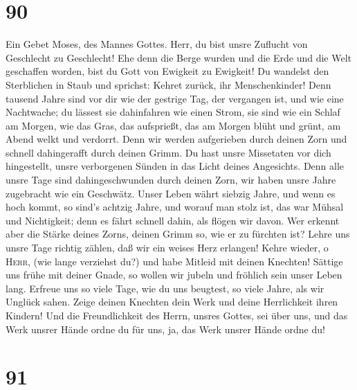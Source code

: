 \hypertarget{section-89}{%
\section{90}\label{section-89}}

 Ein Gebet Moses, des Mannes Gottes. Herr, du bist unsre
Zuflucht von Geschlecht zu Geschlecht!  Ehe denn die Berge
wurden und die Erde und die Welt geschaffen worden, bist du Gott von
Ewigkeit zu Ewigkeit!  Du wandelst den Sterblichen in
Staub und sprichst: Kehret zurück, ihr Menschenkinder! 
Denn tausend Jahre sind vor dir wie der gestrige Tag, der vergangen ist,
und wie eine Nachtwache;  du lässest sie dahinfahren wie
einen Strom, sie sind wie ein Schlaf am Morgen, wie das Gras, das
aufsprießt,  das am Morgen blüht und grünt, am Abend welkt
und verdorrt.  Denn wir werden aufgerieben durch deinen
Zorn und schnell dahingerafft durch deinen Grimm.  Du hast
unsre Missetaten vor dich hingestellt, unsre verborgenen Sünden in das
Licht deines Angesichts.  Denn alle unsre Tage sind
dahingeschwunden durch deinen Zorn, wir haben unsre Jahre zugebracht wie
ein Geschwätz.  Unser Leben währt siebzig Jahre, und wenn
es hoch kommt, so sind's achtzig Jahre, und worauf man stolz ist, das
war Mühsal und Nichtigkeit; denn es fährt schnell dahin, als flögen wir
davon.  Wer erkennt aber die Stärke deines Zorns, deinen
Grimm so, wie er zu fürchten ist?  Lehre uns unsre Tage
richtig zählen, daß wir ein weises Herz erlangen!  Kehre
wieder, o \textsc{Herr}, (wie lange verziehst du?) und habe Mitleid mit
deinen Knechten!  Sättige uns frühe mit deiner Gnade, so
wollen wir jubeln und fröhlich sein unser Leben lang. 
Erfreue uns so viele Tage, wie du uns beugtest, so viele Jahre, als wir
Unglück sahen.  Zeige deinen Knechten dein Werk und deine
Herrlichkeit ihren Kindern!  Und die Freundlichkeit des
Herrn, unsres Gottes, sei über uns, und das Werk unsrer Hände ordne du
für uns, ja, das Werk unsrer Hände ordne du!

\hypertarget{section-90}{%
\section{91}\label{section-90}}

